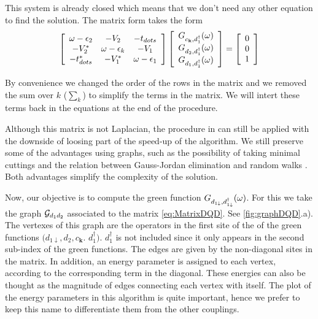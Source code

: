  This system is already closed which means that we don't need any other equation to find the solution. The matrix form takes the form
 \begin{equation}
\left[\begin{array}{ccc}
\omega-\epsilon_{2} & -V_{2} & -t_{dots}\\
-V_{2}^{*} & \omega-\epsilon_{k} & -V_{1}\\
-t_{dots}^{*} & -V_{1}^{*} & \omega-\epsilon_{1}
\end{array}\right]\left[\begin{array}{c}
G_{c_{\mathbf{k}},d_{1}^{\dagger}}(\omega)\\
G_{d_2,d_{1}^{\dagger}}(\omega)\\
G_{d_{1},d_{1}^{\dagger}}(\omega)
\end{array}\right]=\left[\begin{array}{c}
0\\
0\\
1
\end{array}\right]
\label{eq:MatrixDQD}
 \end{equation}
 
\noindent By convenience we changed the order of the rows in the matrix and we removed the sum over $k$ ($\sum_k$) to simplify the terms in the matrix. We will intert these terms back in the equations at the end of the procedure.

Although this matrix is not Laplacian, the procedure in \cite{spielman10}  can still be applied with the downside of loosing part of the  speed-up of the algorithm. We still preserve  some of the advantages  using graphs, such as the possibility of taking minimal cuttings and the relation between Gauss-Jordan elimination and random walks \cite{spielman10}  . Both advantages simplify the complexity of the solution. 
 
Now, our objective is to compute the green function  $G_{d_{1\downarrow},d_{1\downarrow}^{\dagger}}(\omega)$.   For this we take the graph $\mathcal{G}_{d_1d_2}$ associated to the matrix  \eqref{eq:MatrixDQD}. See \ref{fig:graphDQD}.a).  The vertexes of this graph are the operators in the first site of the of the green functions  $(d_{1\downarrow},d_{2},c_{\boldsymbol{k}}$. $d_1^\dagger)$. $d^\dagger_1$ is not included since it only appears in the second sub-index of the green functions. The edges are given by the non-diagonal sites in the matrix. In addition, an energy parameter is assigned to each vertex, according to the corresponding term in the diagonal. These energies can also be thought as the magnitude of edges connecting each vertex with itself. The plot of the energy parameters in this algorithm is quite important, hence we prefer to keep this name to differentiate them from the other couplings.  

